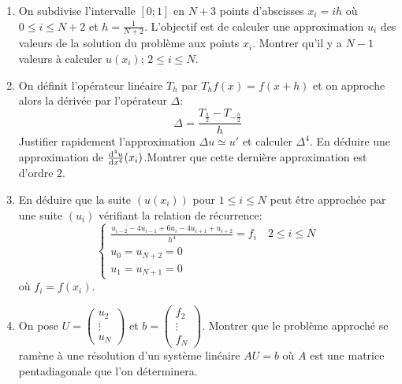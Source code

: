 \documentclass[a4paper]{article}
\def \de {{\rm d}}
\begin{document}
\begin{enumerate}
\item On subdivise l'intervalle $[0; 1]$ en $N+3$ points d'abscisses $x_i = ih$ où $0\leq i\leq N+2$ et $h = \frac 1{N+2}$.  L'objectif est de calculer une approximation $u_i$ des valeurs de la solution du problème aux points $x_i$. Montrer qu'il y a  $N-1$ valeurs à calculer $u(x_i)$;  $2\leq i\leq N$. 

\item On définit l'opérateur linéaire $T_h$ par $T_hf(x)=f(x+h)$ et on approche alors la dérivée par l'opérateur $\Delta$:
\[\Delta = \frac{T_{\frac h2}-T_{-\frac h2}}{h}\]
Justifier rapidement l'approximation $\Delta u\simeq u'$ et calculer $\Delta^4$. En déduire une approximation de $\frac{\de^4 u}{\de x^4}(x_i)$.Montrer que cette dernière approximation est  d'ordre 2. 

\item En déduire que la suite $(u(x_i))$ pour $1\leq i\leq N$ peut être approchée par une suite $(u_i)$ vérifiant la relation de récurrence:
\[\left\{\begin{array}{l}
\frac{u_{i-2}-4u_{i-1}+6u_i-4u_{i+1}+u_{i+2}}{h^4}=f_i \quad 2\leq i\leq N\\
u_0=u_{N+2}=0\\
u_1=u_{N+1}=0
\end{array}\right.
\]
où  $f_i=f(x_i)$.
\item On pose $U=\left(\begin{array}{c}  u_2 \\ \vdots \\ u_N \end{array}\right)$ et $b=\left(\begin{array}{c} f_2 \\ \vdots \\ f_N \end{array}\right)$. Montrer que le problème approché se ramène à une résolution d'un système linéaire $A U = b$ où $A$ est une matrice pentadiagonale que l'on déterminera.

\end{enumerate}
\end{document}
